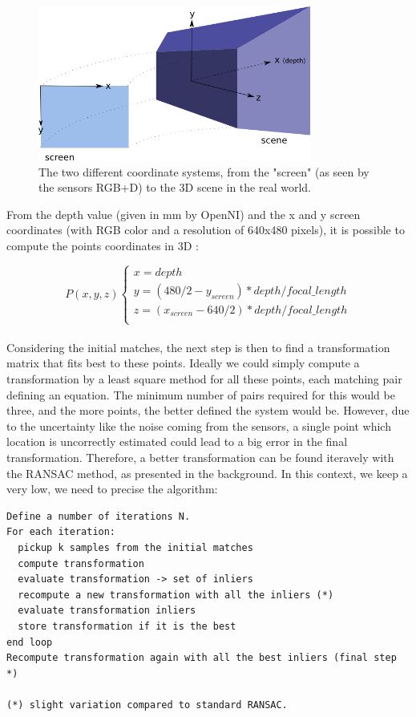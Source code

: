 \begin{figure}[h!]
\centering
\includegraphics[width=0.8\textwidth]{figures/coordinates}
\caption{The two different coordinate systems, from the "screen" (as seen by the sensors RGB+D) to the 3D scene in the real world.}
\end{figure}

From the depth value (given in mm by OpenNI) and the x and y screen coordinates (with RGB color and a resolution of 640x480 pixels), it is possible to compute the points coordinates in 3D :

\[
P(x,y,z)\left\{
\begin{array}{l}
x = depth \\
y = (480/2 - y_{screen}) * depth / focal\_length \\
z = (x_{screen} - 640/2) * depth / focal\_length \\
\end{array}
\right.
\]

\paragraph{}
Considering the initial matches, the next step is then to find a transformation matrix that fits best to these points. Ideally we could simply compute a transformation by a least square method for all these points, each matching pair defining an equation. The minimum number of pairs required for this would be three, and the more points, the better defined the system would be. However, due to the uncertainty like the noise coming from the sensors, a single point which location is uncorrectly estimated could lead to a big error in the final transformation. Therefore, a better transformation can be found iteravely with the RANSAC method, as presented in the background. In this context, we keep a very low, we need to precise the algorithm:

\begin{verbatim}
Define a number of iterations N.
For each iteration:
  pickup k samples from the initial matches 
  compute transformation
  evaluate transformation -> set of inliers
  recompute a new transformation with all the inliers (*)
  evaluate transformation inliers
  store transformation if it is the best
end loop
Recompute transformation again with all the best inliers (final step *)

(*) slight variation compared to standard RANSAC.
\end{verbatim}

